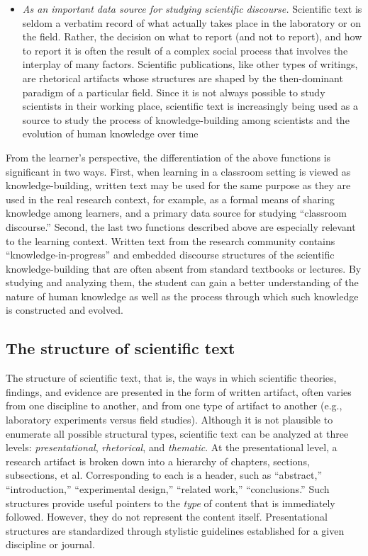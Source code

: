 \begin{itemize}
\item {\it As an important data source for studying scientific
  discourse.\/} Scientific text is seldom a verbatim record of what
  actually takes place in the laboratory or on the field. Rather, the
  decision on what to report (and not to report), and how to report it is
  often the result of a complex social process that involves the interplay
  of many factors. Scientific publications, like other types of writings,
  are rhetorical artifacts whose structures are shaped by the then-dominant
  paradigm of a particular field. Since it is not always possible to study
  scientists in their working place, scientific text is increasingly being
  used as a source to study the process of knowledge-building among
  scientists and the evolution of human knowledge over time
  \cite{Selzer93,Bazerman88}
\end{itemize}

From the learner's perspective, the differentiation of the above
functions is significant in two ways. First, when learning in a classroom
setting is viewed as knowledge-building, written text may be used for the
same purpose as they are used in the real research context, for example, as
a formal means of sharing knowledge among learners, and a primary data
source for studying ``classroom discourse.'' Second, the last two functions
described above are especially relevant to the learning context. Written
text from the research community contains ``knowledge-in-progress'' and
embedded discourse structures of the scientific knowledge-building that are
often absent from standard textbooks or lectures. By studying and analyzing
them, the student can gain a better understanding of the nature of human
knowledge as well as the process through which such knowledge is
constructed and evolved.


\subsection{The structure of scientific text}

The structure of scientific text, that is, the ways in which scientific
theories, findings, and evidence are presented in the form of written
artifact, often varies from one discipline to another, and from one type of
artifact to another (e.g., laboratory experiments versus field studies).
Although it is not plausible to enumerate all possible structural types,
scientific text can be analyzed at three levels: {\it presentational\/},
{\it rhetorical\/}, and {\it thematic\/}. At the presentational level, a
research artifact is broken down into a hierarchy of chapters, sections,
subsections, et al. Corresponding to each is a header, such as
``abstract,'' ``introduction,'' ``experimental design,'' ``related work,''
``conclusions.'' Such structures provide useful pointers to the {\it
type\/} of content that is immediately followed. However, they do not
represent the content itself. Presentational structures are standardized
through stylistic guidelines established for a given discipline or journal.

